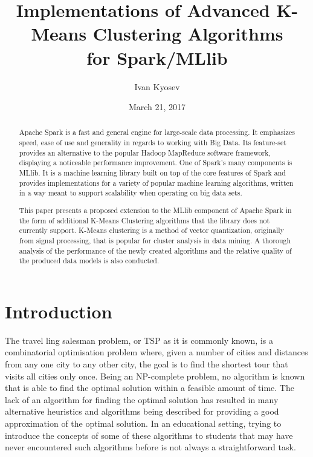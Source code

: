 \documentclass{l4proj}
\begin{document}
\title{Implementations of Advanced K-Means Clustering Algorithms \\ for Spark/MLlib}
\author{Ivan Kyosev}
\date{March 21, 2017}
\maketitle

\begin{abstract}
Apache Spark is a fast and general engine for large-scale data processing. It emphasizes speed, ease of use and generality in regards to working with Big Data. Its feature-set provides an alternative to the popular Hadoop MapReduce software framework, displaying a noticeable performance improvement. One of Spark's many components is MLlib. It is a machine learning library built on top of the core features of Spark and provides implementations for a variety of popular machine learning algorithms, written in a way meant to support scalability when operating on big data sets.

This paper presents a proposed extension to the MLlib component of Apache Spark in the form of additional K-Means Clustering algorithms that the library does not currently support. K-Means clustering is a method of vector quantization, originally from signal processing, that is popular for cluster analysis in data mining. A thorough analysis of the performance of the newly created algorithms and the relative quality of the produced data models is also conducted.
\end{abstract}

\educationalconsent
%
%
\tableofcontents
\chapter{Introduction}
\label{intro}
The travel ling salesman problem, or TSP as it is commonly known, is a combinatorial optimisation problem where, given a number of cities and 
distances from any one city to any other city, the goal is to find the shortest tour that visits all cities only once. Being an NP-complete 
problem, no algorithm is known that is able to find the optimal solution within a feasible amount of time. The lack of an algorithm for finding 
the optimal solution has resulted in many alternative heuristics and algorithms being described for providing a good approximation of the optimal 
solution. In an educational setting, trying to introduce the concepts of some of these algorithms to students that may have never encountered 
such algorithms before is not always a straightforward task.
\end{document}
